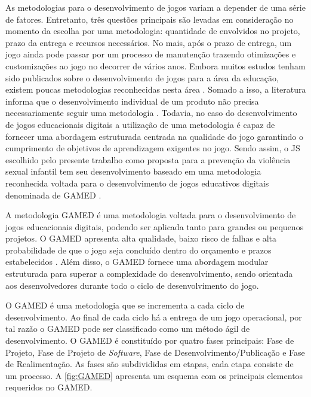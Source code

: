 As metodologias para o desenvolvimento de jogos variam a depender de uma série de fatores. Entretanto, três questões principais são levadas em consideração no momento da escolha por uma metodologia: quantidade de envolvidos no projeto, prazo da entrega e recursos necessários. No mais, após o prazo de entrega, um jogo ainda pode passar por um processo de manutenção trazendo otimizações e customizações ao jogo no decorrer de vários anos. Embora muitos estudos tenham sido publicados sobre o desenvolvimento de jogos para a área da educação, existem poucas metodologias reconhecidas nesta área \cite{aslan2015gamed}. Somado a isso, a literatura informa que o desenvolvimento individual de um produto não precisa necessariamente seguir uma metodologia \cite{valente2021engenharia}. Todavia, no caso do desenvolvimento de jogos educacionais digitais a utilização de uma metodologia é capaz de fornecer uma abordagem estruturada centrada na qualidade do jogo garantindo o cumprimento de objetivos de aprendizagem exigentes no jogo. Sendo assim, o \ac{JS} escolhido pelo presente trabalho como proposta para a prevenção da violência sexual infantil tem seu desenvolvimento baseado em uma metodologia reconhecida voltada para o desenvolvimento de jogos educativos digitais denominada de \ac{GAMED} \cite{aslan2016digital}. 

A metodologia \ac{GAMED} é uma metodologia voltada para o desenvolvimento de jogos educacionais digitais, podendo ser aplicada tanto para grandes ou pequenos projetos. O \ac{GAMED} apresenta alta qualidade, baixo risco de falhas e alta probabilidade de que o jogo seja concluído dentro do orçamento e prazos estabelecidos \cite{aslan2015gamed}. Além disso, o \ac{GAMED} fornece uma abordagem modular estruturada para superar a complexidade do desenvolvimento, sendo orientada aos desenvolvedores durante todo o ciclo de desenvolvimento do jogo.

O \ac{GAMED} é uma metodologia que se incrementa a cada ciclo de desenvolvimento. Ao final de cada ciclo há a entrega de um jogo operacional, por tal razão o \ac{GAMED} pode ser classificado como um método ágil de desenvolvimento. O \ac{GAMED} é constituído por quatro fases principais: Fase de Projeto, Fase de Projeto de \textit{Software}, Fase de Desenvolvimento/Publicação e Fase de Realimentação. As fases são subdivididas em etapas, cada etapa consiste de um processo. A \autoref{fig:GAMED} apresenta um esquema com os principais elementos requeridos no \ac{GAMED}. 

\pagebreak

